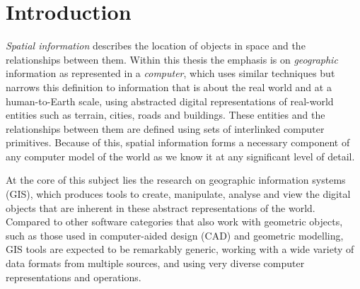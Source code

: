 
\chapter{Introduction}
\label{ch:introduction}


\emph{Spatial information} describes the location of objects in space and the relationships between them.
Within this thesis the emphasis is on \emph{geographic} information as represented in a \emph{computer}, which uses similar techniques but narrows this definition to information that is about the real world and at a human-to-Earth scale, using abstracted digital representations of real-world entities such as terrain, cities, roads and buildings.
These entities and the relationships between them are defined using sets of interlinked computer primitives.
Because of this, spatial information forms a necessary component of any computer model of the world as we know it at any significant level of detail.


At the core of this subject lies the research on geographic information systems (GIS), which produces tools to create, manipulate, analyse and view the digital objects that are inherent in these abstract representations of the world.
Compared to other software categories that also work with geometric objects, such as those used in computer-aided design (CAD) and geometric modelling, GIS tools are expected to be remarkably generic, working with a wide variety of data formats from multiple sources, and using very diverse computer representations and operations.


